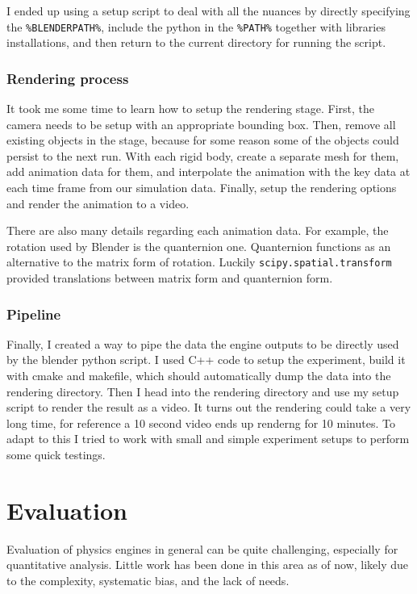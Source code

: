 \documentclass[12pt,a4paper,twoside,openright]{report}
\newcommand{\code}{\texttt}
\begin{document}
I ended up using a setup script to deal with all the nuances by directly specifying the \code{\%BLENDERPATH\%}, include the python in the \code{\%PATH\%} together with libraries installations, and then return to the current directory for running the script.

\subsection{Rendering process}

It took me some time to learn how to setup the rendering stage. First, the camera needs to be setup with an appropriate bounding box. Then, remove all existing objects in the stage, because for some reason some of the objects could persist to the next run. With each rigid body, create a separate mesh for them, add animation data for them, and interpolate the animation with the key data at each time frame from our simulation data. Finally, setup the rendering options and render the animation to a video.

There are also many details regarding each animation data. For example, the rotation used by Blender is the quanternion one. Quanternion functions as an alternative to the matrix form of rotation. Luckily \code{scipy.spatial.transform} provided translations between matrix form and quanternion form.

\subsection{Pipeline}

Finally, I created a way to pipe the data the engine outputs to be directly used by the blender python script. I used C++ code to setup the experiment, build it with cmake and makefile, which should automatically dump the data into the rendering directory. Then I head into the rendering directory and use my setup script to render the result as a video. It turns out the rendering could take a very long time, for reference a 10 second video ends up renderng for 10 minutes. To adapt to this I tried to work with small and simple experiment setups to perform some quick testings.



\chapter{Evaluation}\label{chap4}


Evaluation of physics engines in general can be quite challenging, 
especially for quantitative analysis.
Little work has been done in this area as of now, 
likely due to the complexity, systematic bias, and the lack of needs.
\end{document}
